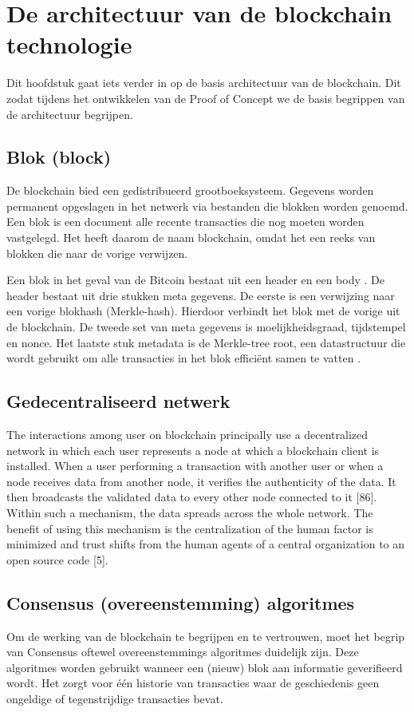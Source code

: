 \chapter{De architectuur van de blockchain technologie}
Dit hoofdstuk gaat iets verder in op de basis architectuur van de blockchain. Dit zodat tijdens het ontwikkelen van de Proof of Concept we de basis begrippen van de architectuur begrijpen.

\section{Blok (block)}
De blockchain bied een gedistribueerd grootboeksysteem. Gegevens worden permanent opgeslagen in het netwerk via bestanden die blokken worden genoemd. Een blok is een document alle recente transacties die nog moeten worden vastgelegd. Het heeft daarom de naam blockchain, omdat het een reeks van blokken die naar de vorige verwijzen\cite{blochchainTechSymmbioticDev}.\par

Een blok in het geval van de Bitcoin bestaat uit een header en een body \cite{blockchainIssuesAndChallenges}. De header bestaat uit drie stukken meta gegevens. De eerste is een verwijzing naar een vorige blokhash (Merkle-hash). Hierdoor verbindt het blok met de vorige uit de blockchain. De tweede set van meta gegevens is  moelijkheidsgraad, tijdstempel en nonce. Het laatste stuk metadata is de Merkle-tree root, een datastructuur die wordt gebruikt om alle transacties in het blok efficiënt samen te vatten \cite{masteringBitcoin}.

\section{Gedecentraliseerd netwerk}
The interactions among user on blockchain principally use a decentralized network in which each user represents a node at which a blockchain client is installed. When a user performing a transaction with another user or when a node receives data from another node, it verifies the authenticity of the data. It then broadcasts the validated data to every other node connected to it [86]. Within such a mechanism, the data spreads across the whole network. The benefit of using this mechanism is the centralization of the human factor is minimized and trust shifts from the human agents of a central organization to an open source code [5].

\section{Consensus (overeenstemming) algoritmes}
Om de werking van de blockchain te begrijpen en te vertrouwen, moet het begrip van Consensus oftewel overeenstemmings algoritmes duidelijk zijn. Deze algoritmes worden gebruikt wanneer een (nieuw) blok aan informatie geverifieerd wordt. Het zorgt voor één historie van transacties waar de geschiedenis geen ongeldige of tegenstrijdige transacties bevat.\par

